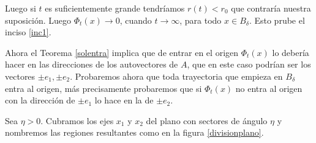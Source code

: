 \begin{demo}
Luego si $t$ es suficientemente grande tendríamos $r(t)<r_0$ que
contraría nuestra suposición. Luego $\Phi_t(x)\to 0$, cuando
$t\to\infty$, para todo $x\in B_{\delta}$. Esto prube el inciso
\ref{inc1}.

 Ahora el Teorema \ref{solentra} implica que de entrar
en el origen $\Phi_t(x)$ lo debería hacer en las direcciones de
los autovectores de $A$, que en este caso podrían ser los vectores
$\pm e_1,\pm e_2$. Probaremos ahora que toda trayectoria que
empieza en $B_{\delta}$ entra al origen, más precisamente
probaremos que si $\Phi_t(x)$ no entra al origen con la dirección
de  $\pm e_1$ lo hace en la de $\pm e_2$.

Sea $\eta>0$. Cubramos los ejes $x_1$ y $x_2$ del plano con
sectores de ángulo $\eta$ y nombremos las regiones resultantes
como en la figura \ref{divisionplano}.
\begin{figure}[h]


\end{figure}
\end{demo}
